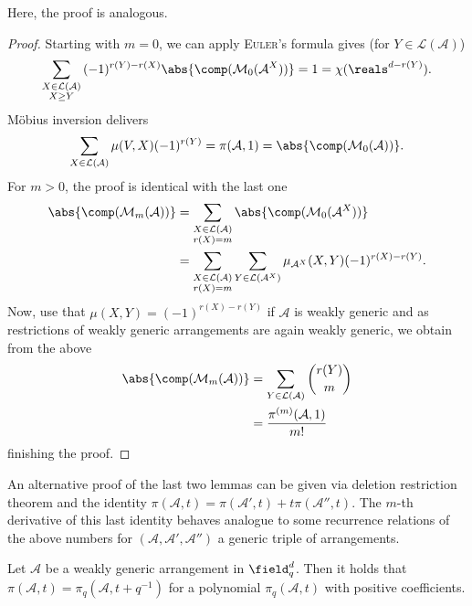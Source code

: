 \message{ !name(OnTheRAIDProblem.tex)}\documentclass[8pt,a4paper]{article}
\begin{document}
Here, the proof is analogous.

\begin{proof}
Starting with $m=0$, we can apply \textsc{Euler}'s formula gives (for $Y\in\mathcal{L}(\mathcal{A})$)
\begin{equation}
\sum_{\substack{X\in\mathcal{L}(\mathcal{A})\\ X\geq Y}}{(-1)^{r(Y)-r(X)}\abs{\comp(\mathcal{M}_0(\mathcal{A}^X))}}=1=\chi(\reals^{d-r(Y)})\text{.}
\end{equation}
Möbius inversion delivers
\begin{equation}
\sum_{X\in\mathcal{L}(\mathcal{A})}{\mu(V,X)(-1)^{r(Y)}}=\pi(\mathcal{A},1)=\abs{\comp(\mathcal{M}_0(\mathcal{A}))}\text{.}
\end{equation}
For $m>0$, the proof is identical with the last one
\begin{align}
\abs{\comp(\mathcal{M}_m(\mathcal{A}))} &=\sum_{\substack{X\in\mathcal{L}(\mathcal{A})\\ r(X)=m}}{\abs{\comp(\mathcal{M}_0(\mathcal{A}^X))}}\\
&=\sum_{\substack{X\in\mathcal{L}(\mathcal{A})\\ r(X)=m}}{\sum_{Y\in\mathcal{L}(\mathcal{A}^X)}{\mu_{\mathcal{A}^X}(X,Y)(-1)^{r(X)-r(Y)}}}\text{.}
\end{align}
Now, use that $\mu(X,Y)=(-1)^{r(X)-r(Y)}$ if $\mathcal{A}$ is weakly generic and as restrictions of weakly generic arrangements are again weakly generic, we obtain from the above
\begin{align}
\abs{\comp(\mathcal{M}_m(\mathcal{A}))} & =\sum_{Y\in\mathcal{L}(\mathcal{A})}{\binom{r(Y)}{m}}\\
& = \frac{\pi^{(m)}(\mathcal{A},1)}{m!}
\end{align}
finishing the proof.
\end{proof}

\begin{remark}
An alternative proof of the last two lemmas can be given via deletion restriction theorem and the identity $\pi(\mathcal{A},t)=\pi(\mathcal{A}',t)+t\pi(\mathcal{A}'',t)$. The $m$-th derivative of this last identity behaves analogue to some recurrence relations of the above numbers for $(\mathcal{A},\mathcal{A}',\mathcal{A}'')$ a generic triple of arrangements.
\end{remark}

\begin{corollary}
Let $\mathcal{A}$ be a weakly generic arrangement in $\field_q^d$. Then it holds that $\pi(\mathcal{A},t)=\pi_q(\mathcal{A},t+q^{-1})$ for a polynomial $\pi_q(\mathcal{A},t)$ with positive coefficients.
\end{corollary}
\end{document}
